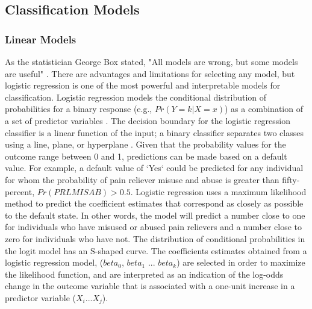 \documentclass[sigconf]{acmart}
\begin{document}

\subsection{Classification Models}

\subsubsection{Linear Models}

As the statistician George Box stated, "All models are wrong, but some models 
are useful" \cite{box05}. There are advantages and limitations for selecting
any model, but logistic regression is one of the most powerful and interpretable 
models for classification. Logistic regression models the conditional 
distribution of probabilities for a binary response (e.g., $Pr(Y=k | X=x)$) 
as a combination of a set of predictor variables \cite{james13, raschka17}. 
The decision boundary for the logistic regression classifier is a linear 
function of the input; a binary classifier separates two classes using a line, 
plane, or hyperplane \cite{muller17}. Given that the probability values for 
the outcome range between 0 and 1, predictions can be made based on a default 
value. For example, a default value of `Yes` could be predicted for any 
individual for whom the probability of pain reliever misuse and abuse is 
greater than fifty-percent, $Pr(PRLMISAB) > 0.5$. Logistic regression uses 
a maximum likelihood method to predict the coefficient estimates that 
correspond as closely as possible to the default state. In other words, the 
model will predict a number close to one for individuals who have misused or 
abused pain relievers and a number close to zero for individuals who have 
not. The distribution of conditional probabilities in the logit model has an 
S-shaped curve. The coefficients estimates obtained from a logistic regression 
model, ($beta_0$, $beta_1$ ... $beta_k$) are selected in order to maximize the 
likelihood function, and are interpreted as an indication of the log-odds 
change in the outcome variable that is associated with a one-unit increase 
in a predictor variable ($X_i$...$X_j$). 
\end{document}
